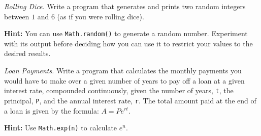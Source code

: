 \documentclass[11pt]{exam}
\newcommand{\ColorQuestion}[2]{\renewcommand{\questionlabel}{\colorbox{#1}{\color{white}\thequestion}\hfill}\question #2}
\newcommand{\YellowQuestion}[1]{\ColorQuestion{Goldenrod}{#1}}
\newcommand{\RedQuestion}[1]{\ColorQuestion{BrickRed}{#1}}
\begin{document}
\begin{questions}
		\YellowQuestion{\emph{Rolling Dice.} Write a program that generates and prints two random integers between $1$ and $6$ (as if you were rolling dice).}
		
		{\small\textbf{Hint:} You can use \lstinline{Math.random()} to generate a random number. Experiment with its output before deciding how you can use it to restrict your values to the desired results.}

		\RedQuestion{\emph{Loan Payments.} Write a program that calculates the monthly payments you would have to make over a given number of years to pay off a loan at a given interest rate, compounded continuously, given the number of years, \lstinline{t}, the principal, \lstinline{P}, and the annual interest rate, \lstinline{r}. The total amount paid at the end of a loan is given by the formula: $A = Pe^{rt}$.}
		
		{\small\textbf{Hint:} Use \lstinline{Math.exp(n)} to calculate $e^n$.}

	\end{questions}
\end{document}
